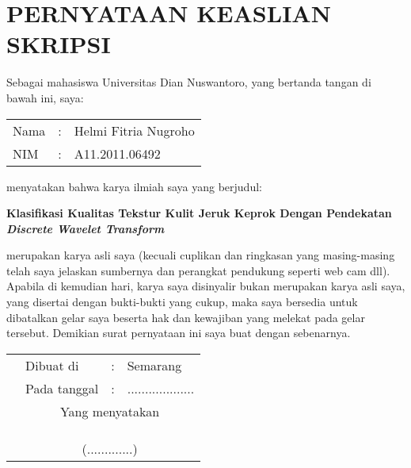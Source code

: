 \documentclass[laporan.tex]{subfiles}
\begin{document}
\chapter*{PERNYATAAN KEASLIAN SKRIPSI}

Sebagai mahasiswa Universitas Dian Nuswantoro, yang bertanda tangan di bawah ini, saya:

\begin{tabular}{l c l}
Nama & : & Helmi Fitria Nugroho \\
NIM & : & A11.2011.06492 \\
\end{tabular}

menyatakan bahwa karya ilmiah saya yang berjudul:

\begin{centering}
\bfseries Klasifikasi Kualitas Tekstur Kulit Jeruk Keprok Dengan Pendekatan \emph{Discrete Wavelet Transform}
\end{centering}

merupakan karya asli saya (kecuali cuplikan dan ringkasan yang masing-masing telah saya jelaskan sumbernya dan perangkat pendukung seperti web cam dll). Apabila di kemudian hari, karya saya disinyalir bukan merupakan karya asli saya, yang disertai dengan bukti-bukti yang cukup, maka saya bersedia untuk dibatalkan gelar saya beserta hak dan kewajiban yang melekat pada gelar tersebut. Demikian surat pernyataan ini saya buat dengan sebenarnya.

\begin{tabular}{p{10em} l c l}
& Dibuat di & : & Semarang \\
& Pada tanggal & : & ................... \\
& \multicolumn{3}{c}{Yang menyatakan} \\
& & & \\
& & & \\
& & & \\
& \multicolumn{3}{c}{(.............)} \\
\end{tabular}
\end{document}
